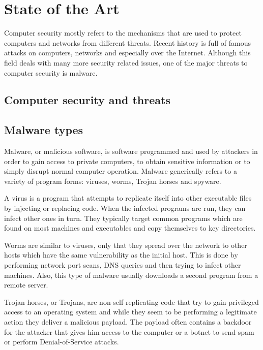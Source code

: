 \chapter{State of the Art}
\label{chapter:second}

Computer security mostly refers to the mechanisms that are used to protect computers and networks from different threats. Recent history is full of famous attacks on computers, networks and especially over the Internet. Although this field deals with many more security related issues, one of the major threats to computer security is malware.

\section{Computer security and threats}



\section{Malware types}
\label{sec:mal-types}

Malware, or malicious software, is software programmed and used by attackers in order to gain access to private computers, to obtain sensitive information or to simply disrupt normal computer operation. Malware generically refers to a variety of program forms: viruses, worms, Trojan horses and spyware.

A virus is a program that attempts to replicate itself into other executable files by injecting or replacing code. When the infected programs are run, they can infect other ones in turn. They typically target common programs which are found on most machines and executables and copy themselves to key directories.

Worms are similar to viruses, only that they spread over the network to other hosts which have the same vulnerability as the initial host. This is done by performing network port scans, DNS queries and then trying to infect other machines. Also, this type of malware usually downloads a second program from a remote server.

Trojan horses, or Trojans, are non-self-replicating code that try to gain privileged access to an operating system and while they seem to be performing a legitimate action they deliver a malicious payload. The payload often contains a backdoor for the attacker that gives him access to the computer or a botnet to send spam or perform Denial-of-Service attacks.

